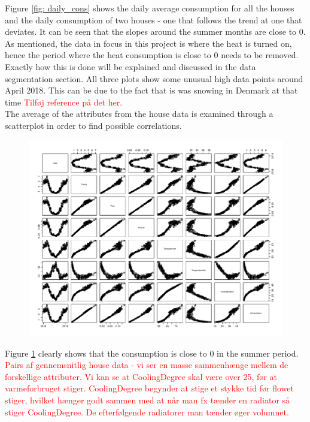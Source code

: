 \noindent Figure \ref{fig: daily_cons} shows the daily average consumption for all the houses and the daily consumption of two houses - one that follows the trend at one that deviates. It can be seen that the slopes around the summer months are close to 0. As mentioned, the data in focus in this project is where the heat is turned on, hence the period where the heat consumption is close to 0 needs to be removed. Exactly how this is done will be explained and discussed in the data segmentation section. All three plots show some unusual high data points around April 2018. This can be due to the fact that is was snowing in Denmark at that time \textcolor{red}{Tilføj reference på det her}. 
\newline \\
\noindent The average of the attributes from the house data is examined through a scatterplot in order to find possible correlations.
\begin{figure}
    \centering
    \includegraphics[width=.8\textwidth]{../../../figures/house_attri.pdf}
    \caption{}
    \label{fig: house_attri}
\end{figure}
\noindent Figure \ref{fig: house_attri} clearly shows that the consumption is close to 0 in the summer period.  
\textcolor{red}{Pairs af gennemsnitlig house data - vi ser en masse sammenhænge mellem de forskellige attributer. Vi kan se at CoolingDegree skal være over 25, før at varmeforbruget stiger.}
\textcolor{red}{CoolingDegree begynder at stige et stykke tid før flowet stiger, hvilket hænger godt sammen med at når man fx tænder en radiator så stiger CoolingDegree. De efterfølgende radiatorer man tænder øger volumnet.} \\

